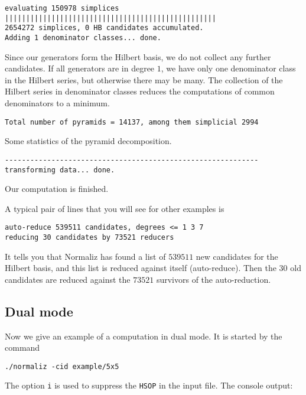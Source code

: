 \documentclass[12pt,a4paper]{scrartcl}
\theoremstyle{definition}
\begin{document}
\begin{Verbatim}
evaluating 150978 simplices
||||||||||||||||||||||||||||||||||||||||||||||||||
2654272 simplices, 0 HB candidates accumulated.
Adding 1 denominator classes... done.
\end{Verbatim}
Since our generators form the Hilbert basis, we do not collect any further candidates. If all generators are in degree $1$, we have only one denominator class in the Hilbert series, but otherwise there may be many. The collection of the Hilbert series in denominator classes reduces the computations of common denominators to a minimum.
\begin{Verbatim}
Total number of pyramids = 14137, among them simplicial 2994
\end{Verbatim}
Some statistics of the pyramid decomposition.
\begin{Verbatim}
------------------------------------------------------------
transforming data... done.
\end{Verbatim}
Our computation is finished.

A typical pair of lines that you will see for other examples is
\begin{Verbatim}
auto-reduce 539511 candidates, degrees <= 1 3 7 
reducing 30 candidates by 73521 reducers
\end{Verbatim}
It tells you that Normaliz has found a list of $539511$ new candidates for the Hilbert basis, and this list is reduced against itself (auto-reduce). Then the $30$ old candidates are reduced against the $73521$ survivors of the auto-reduction.

\subsection{Dual mode}

Now we give an example of a computation in dual mode. It is started by the command
\begin{Verbatim}
./normaliz -cid example/5x5
\end{Verbatim}
The option \verb|i| is used to suppress the \verb|HSOP| in the input file. The console output:
\end{document}
